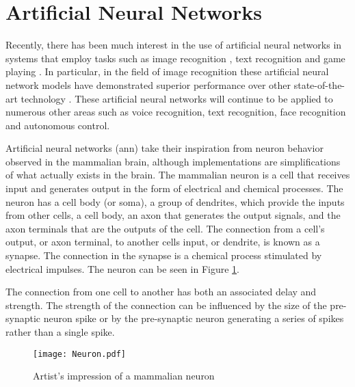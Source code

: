 
\section{Artificial Neural Networks}
\label{sec:Artificial Neural Networks}
\label{sec:chap-two}

Recently, there has been much interest in the use of artificial neural networks in systems that employ tasks such as image recognition \cite{krizhevsky2012imagenet}, text recognition \cite{qiu2013parallel} and game playing \cite{maddison2014move}.
In particular, in the field of image recognition these artificial neural network models have demonstrated superior performance
over other state-of-the-art technology \cite{krizhevsky2012imagenet}.
These artificial neural networks will continue to be applied to numerous other areas such as voice recognition, text recognition, 
face recognition and autonomous control.

Artificial neural networks (\ac{ann}) take their inspiration from neuron behavior observed in the mammalian brain, although implementations are simplifications of what actually exists in the brain.
The mammalian neuron is a cell that receives input and generates output in the form of electrical and chemical processes.
The neuron has a cell body (or soma), a group of dendrites, which provide the inputs from other cells, a cell body, an axon that generates the output signals, and the axon terminals that are the outputs of the cell.
The connection from a cell's output, or axon terminal, to another cells input, or dendrite, is known as a synapse. 
The connection in the synapse is a chemical process stimulated by electrical impulses.
The neuron can be seen in Figure \ref{fig:neuron}.

The connection from one cell to another has both an associated delay and strength. The strength of the connection can be influenced by the size of the pre-synaptic neuron spike or by the pre-synaptic neuron generating a series of spikes rather than a single spike.

\begin{figure}[!t]
\centering
\captionsetup{justification=centering}
\captionsetup{width=.9\linewidth}
\centerline{
\mbox{\texttt{[image: Neuron.pdf]}}
}
\caption{Artist's impression of a mammalian neuron \cite{wikipedia_neuron}}
\label{fig:neuron}
\end{figure}



